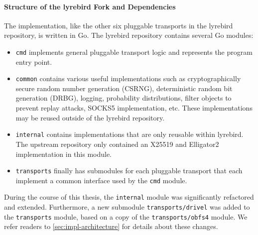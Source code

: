 \paragraph{Structure of the lyrebird Fork and Dependencies}

The \drivel{} implementation, like the other six pluggable transports in the lyrebird repository, is written in Go. The lyrebird repository contains several Go modules:
\begin{itemize}
    \item \texttt{cmd} implements general pluggable transport logic and represents the program entry point.
    
    \item \texttt{common} contains various useful implementations such as cryptographically secure random number generation (CSRNG), deterministic random bit generation (DRBG), logging, probability distributions, filter objects to prevent replay attacks, SOCKS5 implementation, etc. These implementations may be reused outside of the lyrebird repository.
    
    \item \texttt{internal} contains implementations that are only reusable within lyrebird. The upstream repository only contained an X25519 and \textsf{Elligator2}~\cite{CCS:BHKL13} implementation in this module.
    
    \item \texttt{transports} finally has submodules for each pluggable transport that each implement a common interface used by the \texttt{cmd} module.
\end{itemize}

During the course of this thesis, the \texttt{internal} module was significantly refactored and extended. Furthermore, a new submodule \texttt{transports/drivel} was added to the \texttt{transports} module, based on a copy of the \texttt{transports/obfs4} module. We refer readers to \cref{sec:impl-architecture} for details about these changes.

